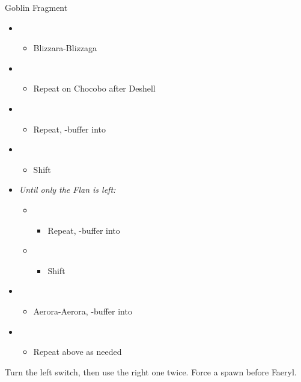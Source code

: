 \begin{battle}{Goblin Fragment}
\begin{itemize}
	\item \sixth
	\begin{itemize}
		\item Blizzara-Blizzaga
	\end{itemize}
	\item \third
	\begin{itemize}
		\item Repeat on Chocobo after Deshell
	\end{itemize}
	\item \second
	\begin{itemize}
		\item Repeat, \com-buffer into
	\end{itemize}
	\item \first
	\begin{itemize}
		\item Shift
	\end{itemize}
	\item \textit{Until only the Flan is left:}
	\begin{itemize}
		\item \sixth
		\begin{itemize}
			\item Repeat, \com-buffer into
		\end{itemize}
		\item \first
		\begin{itemize}
			\item Shift
		\end{itemize}
	\end{itemize}
	\item \sixth
	\begin{itemize}
		\item Aerora-Aerora, \com-buffer into
	\end{itemize}
	\item \first
	\begin{itemize}
		\item Repeat above as needed
	\end{itemize}
\end{itemize}
\end{battle}

Turn the left switch, then use the right one twice. Force a spawn before Faeryl.

